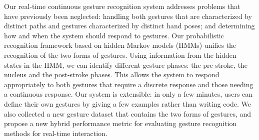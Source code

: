 Our real-time continuous gesture recognition system addresses problems that
have previously been neglected: handling both gestures that are
characterized by distinct paths and gestures characterized by distinct hand
poses; and determining how and when the system should respond to gestures. Our probabilistic 
recognition framework based on hidden
Markov models (HMMs) unifies the recognition of the two forms of gestures.
Using information from the
hidden states in the HMM, we can identify different
gesture phases: the pre-stroke, the nucleus and the post-stroke
phases.
This allows the system to respond appropriately to both gestures that
require a discrete response and those needing a continuous response.
Our system is extensible: in only a few minutes, users can define their own
gestures by giving a few examples rather than writing code.
We also collected a new gesture dataset that
contains the two forms of gestures, and propose a new hybrid performance
metric for evaluating gesture recognition methods for real-time
interaction.